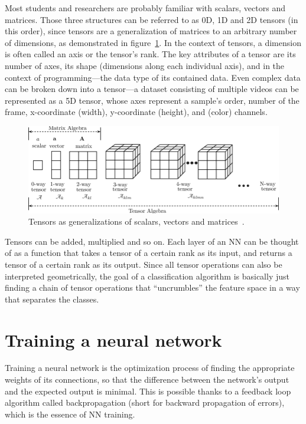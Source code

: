Most students and researchers are probably familiar with scalars, vectors and matrices.
Those three structures can be referred to as 0D, 1D and 2D tensors (in this order),
since tensors are a generalization of matrices to an arbitrary number of dimensions,
as demonstrated in figure~\ref{fig:tensor-ranks}.
In the context of tensors, a dimension is often called an axis or the tensor's rank.
The key attributes of a tensor are its number of axes,
its shape (dimensions along each individual axis), and
in the context of programming---the data type of its contained data.
Even complex data can be broken down into a tensor---a dataset
consisting of multiple videos
can be represented as a 5D tensor, whose axes represent
a sample's order, number of the frame, x-coordinate (width),
y-coordinate (height), and (color) channels.
\pagebreak

\begin{figure}[!ht]
    \centering
    \includegraphics[width=\linewidth]{obrazky-figures/tensor-ranks.png}
    \caption{Tensors as generalizations of scalars, vectors and matrices~\cite{shulga2019tensor}.}
    \label{fig:tensor-ranks}
\end{figure}

Tensors can be added, multiplied and so on.
Each layer of an NN can be thought of as a function that
takes a tensor of a certain rank as its input, and returns a tensor of a certain rank as its output.
Since all tensor operations can also be interpreted geometrically,
the goal of a classification algorithm is basically just finding a chain of tensor
operations that ``uncrumbles'' the feature space in a way that separates the classes.




\section{Training a neural network}
\label{training-a-neural-network}
Training a neural network is the optimization process of finding the appropriate weights of its connections,
so that the difference between the network's output and the expected output is minimal.
This is possible thanks to a feedback loop algorithm
called backpropagation (short for backward propagation of errors),
which is the essence of NN training.

